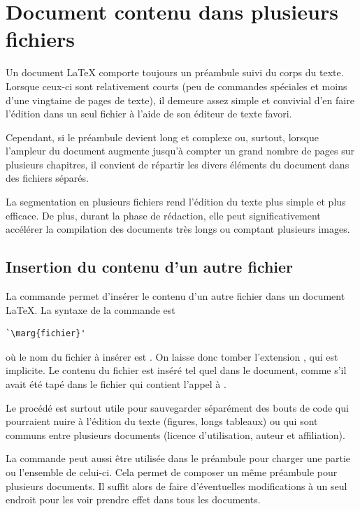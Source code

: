 \chapter{Document contenu dans plusieurs fichiers}
\label{chap:include}

Un document {\LaTeX} comporte toujours un préambule suivi du corps du
texte. Lorsque ceux-ci sont relativement courts (peu de commandes
spéciales et moins d'une vingtaine de pages de texte), il demeure
assez simple et convivial d'en faire l'édition dans un seul fichier à
l'aide de son éditeur de texte favori.

Cependant, si le préambule devient long et complexe ou, surtout,
lorsque l'ampleur du document augmente jusqu'à compter un grand nombre
de pages sur plusieurs chapitres, il convient de répartir les divers
éléments du document dans des fichiers séparés.

La segmentation en plusieurs fichiers rend l'édition du texte plus
simple et plus efficace. De plus, durant la phase de rédaction, elle
peut significativement accélérer la compilation des documents très
longs ou comptant plusieurs images.


\section{Insertion du contenu d'un autre fichier}
\label{sec:include:input}

La commande \cmd{} permet d'insérer le contenu d'un autre
fichier dans un document {\LaTeX}. La syntaxe de la commande est
\begin{lstlisting}
`\marg{fichier}'
\end{lstlisting}
où le nom du fichier à insérer est . On
laisse donc tomber l'extension , qui est implicite. Le
contenu du fichier est inséré tel quel dans le document, comme s'il
avait été tapé dans le fichier qui contient l'appel à \cmd{}.

Le procédé est surtout utile pour sauvegarder séparément des bouts de
code qui pourraient nuire à l'édition du texte (figures, longs
tableaux) ou qui sont communs entre plusieurs documents (licence
d'utilisation, auteur et affiliation).

La commande peut aussi être utilisée dans le préambule pour charger
une partie ou l'ensemble de celui-ci. Cela permet de composer un même
préambule pour plusieurs documents. Il suffit alors de faire
d'éventuelles modifications à un seul endroit pour les voir prendre
effet dans tous les documents.


